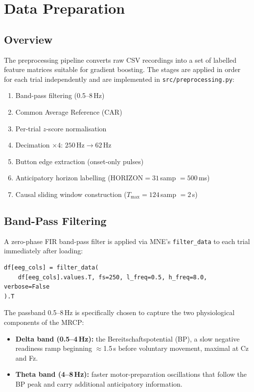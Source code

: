 \documentclass[12pt,a4paper]{article}
\begin{document}
\section{Data Preparation}

\subsection{Overview}

The preprocessing pipeline converts raw CSV recordings into a set of
labelled feature matrices suitable for gradient boosting. The stages are
applied in order for each trial independently and are implemented in
\texttt{src/preprocessing.py}:

\begin{enumerate}[leftmargin=1.5em]
  \item Band-pass filtering (0.5--8\,Hz)
  \item Common Average Reference (CAR)
  \item Per-trial $z$-score normalisation
  \item Decimation $\times 4$: $250\,\text{Hz} \rightarrow 62\,\text{Hz}$
  \item Button edge extraction (onset-only pulses)
  \item Anticipatory horizon labelling ($\text{HORIZON} = 31$\,samp $= 500$\,ms)
  \item Causal sliding window construction ($T_{\max} = 124$\,samp $= 2$\,s)
\end{enumerate}

\subsection{Band-Pass Filtering}

A zero-phase FIR band-pass filter is applied via MNE's
\texttt{filter\_data} to each trial immediately after loading:

\begin{lstlisting}[style=pycode]
df[eeg_cols] = filter_data(
    df[eeg_cols].values.T, fs=250, l_freq=0.5, h_freq=8.0, verbose=False
).T
\end{lstlisting}

The passband 0.5--8\,Hz is specifically chosen to capture the two
physiological components of the MRCP:

\begin{itemize}[leftmargin=1.5em]
  \item \textbf{Delta band (0.5--4\,Hz):} the Bereitschaftspotential (BP),
        a slow negative readiness ramp beginning $\approx$1.5\,s before
        voluntary movement, maximal at Cz and Fz.
  \item \textbf{Theta band (4--8\,Hz):} faster motor-preparation
        oscillations that follow the BP peak and carry additional
        anticipatory information.
\end{itemize}
\end{document}
